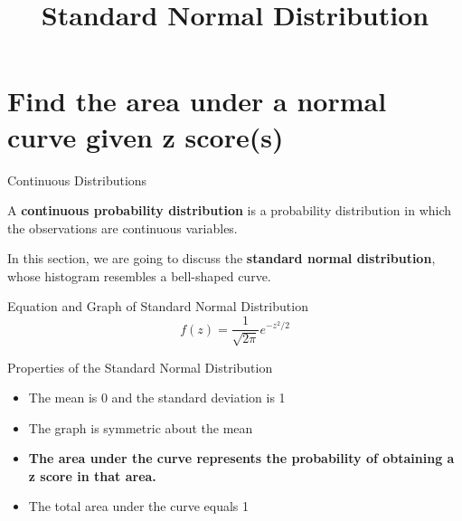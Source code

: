 \documentclass[t]{beamer}
\title{Standard Normal Distribution}
\author{}
\date{}
\begin{document}

\begin{frame} 
\maketitle
\end{frame}

\section{Find the area under a normal curve given z score(s)}

\begin{frame}{Continuous Distributions}
\begin{tcolorbox}[colframe=green!20!black, colback = green!30!white,title=\textbf{Continuous Probability Distribution}]
A \textbf{continuous probability distribution} is a probability distribution in which the observations are continuous variables.
\end{tcolorbox}
\bigskip	\pause

In this section, we are going to discuss the {\color{blue}\textbf{standard normal distribution}}, whose histogram resembles a bell-shaped curve.
\end{frame}

\begin{frame}{Equation and Graph of Standard Normal Distribution}
\[f(z) = \frac{1}{\sqrt{2\pi}} e^{-z^2/2} \]	\smallskip
\begin{center}
\end{center}
\end{frame}

\begin{frame}{Properties of the Standard Normal Distribution}
\begin{itemize}
	\item<+-> The mean is 0 and the standard deviation is 1
	\item<+-> The graph is symmetric about the mean
	\item<+-> \textbf{The area under the curve represents the probability of obtaining a z score in that area.}
	\item<+-> The total area under the curve equals 1
\end{itemize}
\end{frame}
\end{document}
